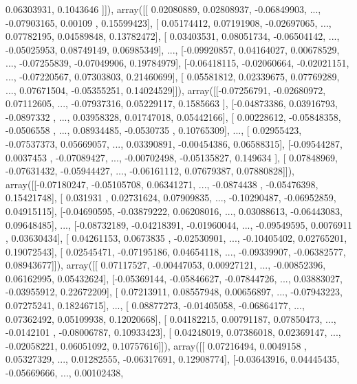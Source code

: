 \documentclass{article}
\begin{document}
         0.06303931,  0.1043646 ]]), array([[ 0.02080889,  0.02808937, -0.06849903, ..., -0.07903165,
         0.00109   ,  0.15599423],
       [ 0.05174412,  0.07191908, -0.02697065, ...,  0.07782195,
         0.04589848,  0.13782472],
       [ 0.03403531,  0.08051734, -0.06504142, ..., -0.05025953,
         0.08749149,  0.06985349],
       ..., 
       [-0.09920857,  0.04164027,  0.00678529, ..., -0.07255839,
        -0.07049906,  0.19784979],
       [-0.06418115, -0.02060664, -0.02021151, ..., -0.07220567,
         0.07303803,  0.21460699],
       [ 0.05581812,  0.02339675,  0.07769289, ...,  0.07671504,
        -0.05355251,  0.14024529]]), array([[-0.07256791, -0.02680972,  0.07112605, ..., -0.07937316,
         0.05229117,  0.1585663 ],
       [-0.04873386,  0.03916793, -0.0897332 , ...,  0.03958328,
         0.01747018,  0.05442166],
       [ 0.00228612, -0.05848358, -0.0506558 , ...,  0.08934485,
        -0.0530735 ,  0.10765309],
       ..., 
       [ 0.02955423, -0.07537373,  0.05669057, ...,  0.03390891,
        -0.00454386,  0.06588315],
       [-0.09544287,  0.0037453 , -0.07089427, ..., -0.00702498,
        -0.05135827,  0.149634  ],
       [ 0.07848969, -0.07631432, -0.05944427, ..., -0.06161112,
         0.07679387,  0.07880828]]), array([[-0.07180247, -0.05105708,  0.06341271, ..., -0.0874438 ,
        -0.05476398,  0.15421748],
       [ 0.031931  ,  0.02731624,  0.07909835, ..., -0.10290487,
        -0.06952859,  0.04915115],
       [-0.04690595, -0.03879222,  0.06208016, ...,  0.03088613,
        -0.06443083,  0.09648485],
       ..., 
       [-0.08732189, -0.04218391, -0.01960044, ..., -0.09549595,
         0.0076911 ,  0.03630434],
       [ 0.04261153,  0.0673835 , -0.02530901, ..., -0.10405402,
         0.02765201,  0.19072543],
       [ 0.02545471, -0.07195186,  0.04654118, ..., -0.09339907,
        -0.06382577,  0.08943677]]), array([[ 0.07117527, -0.00447053,  0.00927121, ..., -0.00852396,
         0.06162995,  0.05432624],
       [-0.05369144, -0.05846627, -0.07844726, ...,  0.03883027,
        -0.03955912,  0.22672209],
       [ 0.07213911,  0.08557948,  0.00656897, ..., -0.07943223,
         0.07275241,  0.18246715],
       ..., 
       [ 0.08877273, -0.01405058, -0.06864177, ...,  0.07362492,
         0.05109938,  0.12020668],
       [ 0.04182215,  0.00791187,  0.07850473, ..., -0.0142101 ,
        -0.08006787,  0.10933423],
       [ 0.04248019,  0.07386018,  0.02369147, ..., -0.02058221,
         0.06051092,  0.10757616]]), array([[ 0.07216494,  0.0049158 ,  0.05327329, ...,  0.01282555,
        -0.06317691,  0.12908774],
       [-0.03643916,  0.04445435, -0.05669666, ...,  0.00102438,
\end{document}
